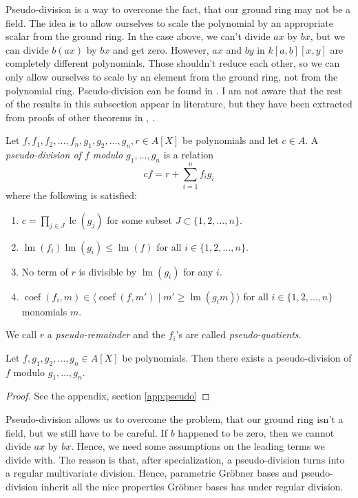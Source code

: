 \documentclass[a4paper, 12pt]{article}
\DeclareMathOperator{\LM}{lm}
\DeclareMathOperator{\LC}{lc}
\DeclareMathOperator{\coef}{coef}
\theoremstyle{changedot}
\theoremstyle{changedotbreak}
\theoremstyle{nonumberplain}
\newtheorem{proof}{Proof}
\begin{document}
Pseudo-division is a way to overcome the fact, that our ground ring may not be a field. The idea is to allow ourselves to scale the polynomial by an appropriate scalar from the ground ring. In the case above, we can't divide $ax$ by $bx$, but we can divide $b(ax)$ by $bx$ and get zero. However, $ax$ and $by$ in $k[a, b][x, y]$ are completely different polynomials. Those shouldn't reduce each other, so we can only allow ourselves to scale by an element from the ground ring, not from the polynomial ring. Pseudo-division can be found in \cite{IVA}. I am not aware that the rest of the results in this subsection appear in literature, but they have been extracted from proofs of other theorems in \cite{grb_covers}, \cite{MONTES20101391}.

\begin{definition}
  Let $f, f_{1}, f_{2}, \dots, f_{n}, g_{1}, g_{2}, \dots, g_{n}, r \in A[X]$ be polynomials and let $c \in A$. A \textit{pseudo-division of $f$ modulo $g_{1}, \dots, g_{n}$} is a relation
  \[cf = r + \sum_{i=1}^{n} f_{i}g_{i}\]
  where the following is satisfied:
  \begin{enumerate}
    \item $c = \prod_{j\in J} \LC(g_{j})$ for some subset $J \subset \{1, 2, \dots, n\}$.
    \item $\LM(f_{i})\LM(g_{i}) \leq \LM(f)$ for all $i \in \{1, 2, \dots, n\}$.
    \item No term of $r$ is divisible by $\LM(g_{i})$ for any $i$.
    \item $\coef(f_{i}, m) \in \langle \coef(f, m') \mid m' \geq \LM(g_{i}m) \rangle$ for all $i \in \{1, 2, \dots, n\}$ monomials $m$.
  \end{enumerate}
  We call $r$ a \textit{pseudo-remainder} and the $f_{i}$'s are called \textit{pseudo-quotients}.
\end{definition}


\begin{theorem}\label{thm:exi_pseudo}
  Let $f, g_{1}, g_{2}, \dots, g_{n} \in A[X]$ be polynomials. Then there exists a pseudo-division of $f$ modulo $g_{1}, \dots, g_{n}$.
\end{theorem}
\begin{proof}
  See the appendix, section \ref{app:pseudo}
\end{proof}

Pseudo-division allows us to overcome the problem, that our ground ring isn't a field, but we still have to be careful. If $b$ happened to be zero, then we cannot divide $ax$ by $bx$. Hence, we need some assumptions on the leading terms we divide with. The reason is that, after specialization, a pseudo-division turns into a regular multivariate division. Hence, parametric Gröbner bases and pseudo-division inherit all the nice properties Gröbner bases has under regular division.
\end{document}
